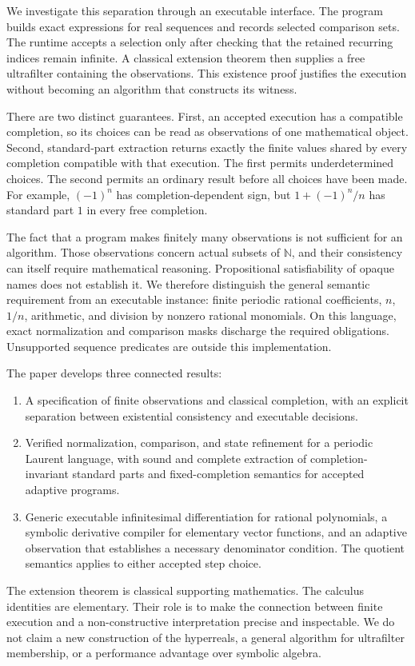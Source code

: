 \documentclass[11pt,a4paper]{article}
\theoremstyle{result}
\theoremstyle{definition}
\newcommand{\N}{\mathbb{N}}
\begin{document}
We investigate this separation through an executable interface. The program builds exact expressions for real sequences and records selected comparison sets. The runtime accepts a selection only after checking that the retained recurring indices remain infinite. A classical extension theorem then supplies a free ultrafilter containing the observations. This existence proof justifies the execution without becoming an algorithm that constructs its witness.

There are two distinct guarantees. First, an accepted execution has a compatible completion, so its choices can be read as observations of one mathematical object. Second, standard-part extraction returns exactly the finite values shared by every completion compatible with that execution. The first permits underdetermined choices. The second permits an ordinary result before all choices have been made. For example, $(-1)^n$ has completion-dependent sign, but $1+(-1)^n/n$ has standard part $1$ in every free completion.

The fact that a program makes finitely many observations is not sufficient for an algorithm. Those observations concern actual subsets of $\N$, and their consistency can itself require mathematical reasoning. Propositional satisfiability of opaque names does not establish it. We therefore distinguish the general semantic requirement from an executable instance: finite periodic rational coefficients, $n$, $1/n$, arithmetic, and division by nonzero rational monomials. On this language, exact normalization and comparison masks discharge the required obligations. Unsupported sequence predicates are outside this implementation.

The paper develops three connected results:
\begin{enumerate}[itemsep=3pt,topsep=4pt]
  \item A specification of finite observations and classical completion, with an explicit separation between existential consistency and executable decisions.
  \item Verified normalization, comparison, and state refinement for a periodic Laurent language, with sound and complete extraction of completion-invariant standard parts and fixed-completion semantics for accepted adaptive programs.
  \item Generic executable infinitesimal differentiation for rational polynomials, a symbolic derivative compiler for elementary vector functions, and an adaptive observation that establishes a necessary denominator condition. The quotient semantics applies to either accepted step choice.
\end{enumerate}
The extension theorem is classical supporting mathematics. The calculus identities are elementary. Their role is to make the connection between finite execution and a non-constructive interpretation precise and inspectable. We do not claim a new construction of the hyperreals, a general algorithm for ultrafilter membership, or a performance advantage over symbolic algebra.
\end{document}
